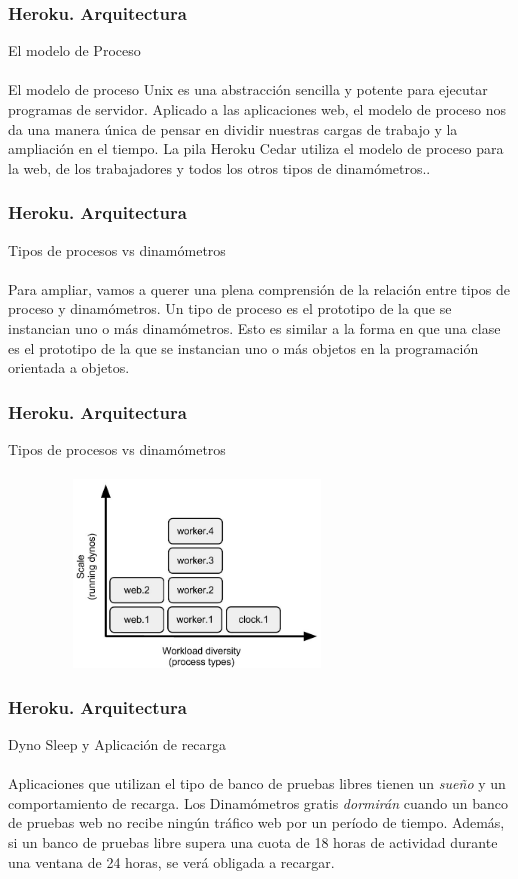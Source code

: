 \documentclass{beamer}
\begin{document}
\begin{frame}
	\frametitle{Heroku. Arquitectura}
	El modelo de Proceso\\ \ \\
El modelo de proceso Unix es una abstracción sencilla y potente para ejecutar programas de servidor. Aplicado a las aplicaciones web, el modelo de proceso nos da una manera única de pensar en dividir nuestras cargas de trabajo y la ampliación en el tiempo. La pila Heroku Cedar utiliza el modelo de proceso para la web, de los trabajadores y todos los otros tipos de dinamómetros..\\
\end{frame}

\begin{frame}
	\frametitle{Heroku. Arquitectura}
	Tipos de procesos vs dinamómetros\\ \ \\
	Para ampliar, vamos a querer una plena comprensión de la relación entre tipos de proceso y dinamómetros. Un tipo de proceso es el prototipo de la que se instancian uno o más dinamómetros. Esto es similar a la forma en que una clase es el prototipo de la que se instancian uno o más objetos en la programación orientada a objetos.\\
\end{frame}

\begin{frame}
	\frametitle{Heroku. Arquitectura}
	Tipos de procesos vs dinamómetros\\ \ \\
	\includegraphics[width=10cm,height=5cm]{arquitectura/tipodeproceso.jpg}
\end{frame}


\begin{frame}
\frametitle{Heroku. Arquitectura}
Dyno Sleep y Aplicación de recarga\\ \ \\
Aplicaciones que utilizan el tipo de banco de pruebas libres tienen un \textit{sueño} y un comportamiento de recarga. Los Dinamómetros gratis \textit{dormirán} cuando un banco de pruebas web no recibe ningún tráfico web por un período de tiempo. Además, si un banco de pruebas libre supera una cuota de 18 horas de actividad durante una ventana de 24 horas, se verá obligada a recargar.
\end{frame}
\end{document}
